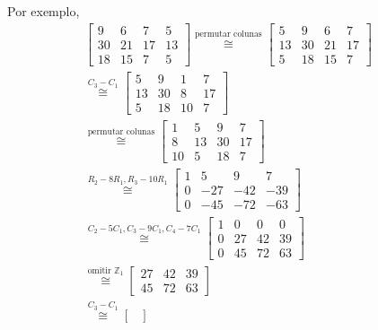     	Por exemplo,
    	\begin{align*}
        	\begin{bmatrix}
        	9 & 6 & 7 & 5 \\
        	30 & 21 & 17 & 13 \\
        	18 & 15 & 7 & 5
        	\end{bmatrix} \stackrel{\text{permutar colunas}}{\cong} 
        	\begin{bmatrix}
        	5 & 9 & 6 & 7 \\
        	13 & 30 & 21 & 17 \\
        	5 & 18 & 15 & 7
        	\end{bmatrix}& \\ \stackrel{C_3 - C_1}{\cong}
        	\begin{bmatrix}
        	5 & 9 & 1 & 7 \\
        	13 & 30 & 8 & 17 \\
        	5 & 18 & 10 & 7
        	\end{bmatrix}& \\ \stackrel{\text{permutar colunas}}{\cong}
        	\begin{bmatrix}
        	1 & 5 & 9 & 7 \\
        	8 & 13 & 30 & 17 \\
        	10 & 5 & 18 & 7
        	\end{bmatrix}& \\ \stackrel{R_2 - 8R_1, R_3 - 10R_1}{\cong}
        	\begin{bmatrix}
        	1 & 5 & 9 & 7 \\
        	0 & -27 & -42 & -39 \\
        	0 & -45 & -72 & -63 
        	\end{bmatrix}& \\ \stackrel{C_2 - 5C_1, C_3 - 9C_1, C_4 - 7C_1}{\cong} 
        	\begin{bmatrix}
        	1 & 0 & 0 & 0 \\
        	0 & 27 & 42 & 39 \\
        	0 & 45 & 72 & 63
        	\end{bmatrix}& \\ \stackrel{\text{omitir }\mathbb{Z}_1}{\cong}
        	\begin{bmatrix}
        	27 & 42 & 39 \\
        	45 & 72 & 63
        	\end{bmatrix}& \\ \stackrel{C_3 - C_1}{\cong}
        	\begin{bmatrix}

\end{bmatrix}
\end{align*}
